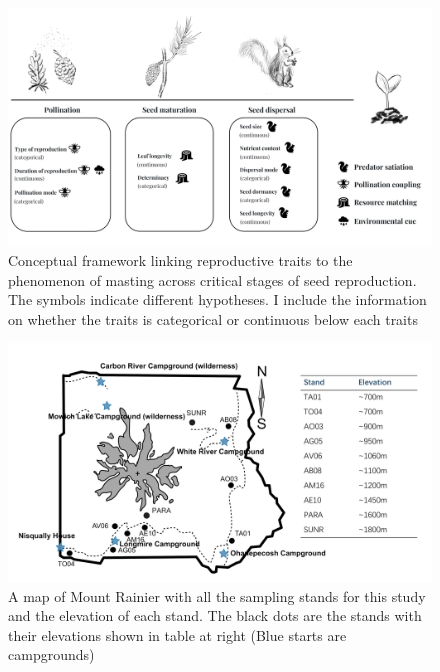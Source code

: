\documentclass[11pt,letter]{article}
\begin{document}
\begin{figure}[htb]
	\centering
	\includegraphics[width=1\linewidth]{conceptualChap1.png}
	\caption{Conceptual framework linking reproductive traits to the phenomenon of masting across critical stages of seed reproduction. The symbols indicate different hypotheses. I include the information on whether the traits is categorical or continuous below each traits}
	\label{fig:conceptual1}
\end{figure}
\begin{figure}[htb]
	\centering
	\includegraphics[width=1\linewidth]{rainierMap.png}
	\caption{A map of Mount Rainier with all the sampling stands for this study and the elevation of each stand. The black dots are the stands with their elevations shown in table at right (Blue starts are campgrounds)}
	\label{fig:sites}
\end{figure}
\end{document}
